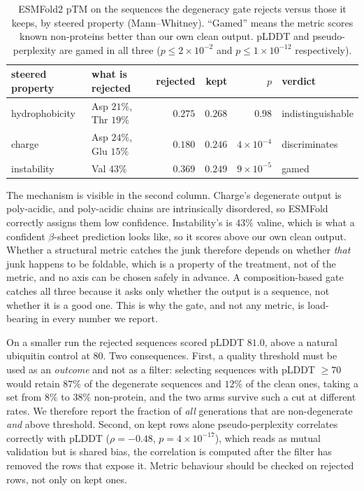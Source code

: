 \documentclass{article}
\begin{document}
\begin{table}[htbp]
\centering
\caption{ESMFold2 pTM on the sequences the degeneracy gate rejects versus those it keeps,
by steered property (Mann--Whitney). ``Gamed'' means the metric scores known non-proteins
better than our own clean output. pLDDT and pseudo-perplexity are gamed in all three
($p \le 2{\times}10^{-2}$ and $p \le 1{\times}10^{-12}$ respectively).}
\label{tab:steer-gate}
\begin{tabular}{llrrrl}
\toprule
steered property & what is rejected & rejected & kept & $p$ & verdict \\
\midrule
hydrophobicity & Asp $21\%$, Thr $19\%$ & $0.275$ & $0.268$ & $0.98$ & indistinguishable \\
charge         & Asp $24\%$, Glu $15\%$ & $0.180$ & $0.246$ & $4{\times}10^{-4}$ & discriminates \\
instability    & Val $43\%$             & $0.369$ & $0.249$ & $9{\times}10^{-5}$ & gamed \\
\bottomrule
\end{tabular}
\end{table}

The mechanism is visible in the second column. Charge's degenerate output is poly-acidic,
and poly-acidic chains are intrinsically disordered, so ESMFold correctly assigns them low
confidence. Instability's is $43\%$ valine, which is what a confident $\beta$-sheet
prediction looks like, so it scores above our own clean output. Whether a structural metric
catches the junk therefore depends on whether \emph{that} junk happens to be foldable, 
which is a property of the treatment, not of the metric, and no axis can be chosen
safely in advance. A composition-based gate catches all three because it asks only whether
the output is a sequence, not whether it is a good one. This is why the gate, and not any
metric, is load-bearing in every number we report.

On a smaller run the rejected sequences scored pLDDT $81.0$, above a natural ubiquitin
control at $80$. Two consequences. First, a quality threshold must be used as an
\emph{outcome} and not as a filter: selecting sequences with pLDDT ${\ge}70$ would retain
$87\%$ of the degenerate sequences and $12\%$ of the clean ones, taking a set from $8\%$ to
$38\%$ non-protein, and the two arms survive such a cut at different rates. We therefore
report the fraction of \emph{all} generations that are non-degenerate \emph{and} above
threshold. Second, on kept rows alone pseudo-perplexity correlates correctly with pLDDT
($\rho{=}-0.48$, $p{=}4{\times}10^{-17}$), which reads as mutual validation but is shared
bias, the correlation is computed after the filter has removed the rows that expose it.
Metric behaviour should be checked on rejected rows, not only on kept ones.
\end{document}

